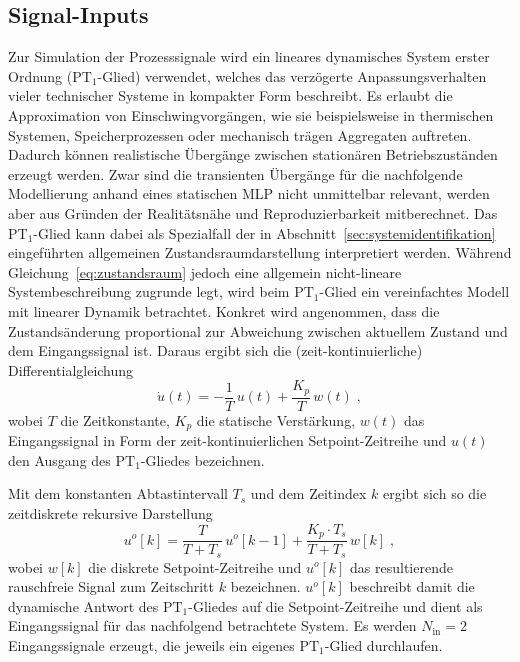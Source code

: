 \subsection{Signal-Inputs} \label{sec:simulation_signal_input}
% 
Zur Simulation der Prozesssignale wird ein lineares dynamisches System erster Ordnung ($\mathrm{PT}_1$-Glied) verwendet, welches das verzögerte Anpassungsverhalten vieler technischer Systeme in kompakter Form beschreibt. Es erlaubt die Approximation von Einschwingvorgängen, wie sie beispielsweise in thermischen Systemen, Speicherprozessen oder mechanisch trägen Aggregaten auftreten. Dadurch können realistische Übergänge zwischen stationären Betriebszuständen erzeugt werden.
Zwar sind die transienten Übergänge für die nachfolgende Modellierung anhand eines statischen \ac{MLP} nicht unmittelbar relevant, werden aber aus Gründen der Realitätsnähe und Reproduzierbarkeit mitberechnet.
Das $\mathrm{PT}_1$-Glied kann dabei als Spezialfall der in Abschnitt~\ref{sec:systemidentifikation} eingeführten allgemeinen Zustandsraumdarstellung interpretiert werden. Während Gleichung~\eqref{eq:zustandsraum} jedoch eine allgemein nicht-lineare Systembeschreibung zugrunde legt, wird beim $\mathrm{PT}_1$-Glied ein vereinfachtes Modell mit linearer Dynamik betrachtet. Konkret wird angenommen, dass die Zustandsänderung proportional zur Abweichung zwischen aktuellem Zustand und dem Eingangssignal ist. Daraus ergibt sich die (zeit-kontinuierliche) Differentialgleichung
%
\begin{equation} \label{eq:pt1}
    \dot{u}(t) = -\frac{1}{T}\, u(t) + \frac{K_p}{T}\, w(t) \; ,
\end{equation}
%
wobei $T$ die Zeitkonstante, $K_p$ die statische Verstärkung, $w(t)$ das Eingangssignal in Form der zeit-kontinuierlichen Setpoint-Zeitreihe und $u(t)$ den Ausgang des $\mathrm{PT}_1$-Gliedes bezeichnen. \par
Mit dem konstanten Abtastintervall $T_s$ und dem Zeitindex $k$ ergibt sich so die zeitdiskrete rekursive Darstellung
%
\begin{equation} \label{eq:diskretes_pt1}
    u^o[k] = \frac{T}{T + T_s}\, u^o[k-1] + \frac{K_p \cdot T_s}{T + T_s}\, w[k] \; ,
\end{equation}
%
wobei $w[k]$ die diskrete Setpoint-Zeitreihe und $u^o[k]$ das resultierende rauschfreie Signal zum Zeitschritt $k$ bezeichnen. $u^o[k]$ beschreibt damit die dynamische Antwort des $\mathrm{PT}_1$-Gliedes auf die Setpoint-Zeitreihe und dient als Eingangssignal für das nachfolgend betrachtete System. Es werden $N_{\mathrm{in}} = 2$ Eingangssignale erzeugt, die jeweils ein eigenes $\mathrm{PT}_1$-Glied durchlaufen. \par
